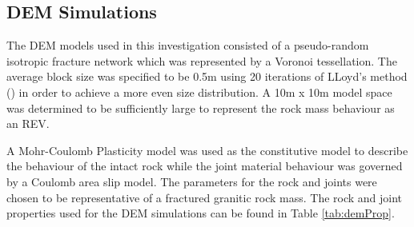 \subsection{DEM Simulations}

The DEM models used in this investigation consisted of a pseudo-random isotropic fracture network which was represented by a Voronoi tessellation. The average block size was specified to be 0.5m using 20 iterations of LLoyd's method (\cite{Lloyd_1982}) in order to achieve a more even size distribution. A 10m x 10m model space was determined to be sufficiently large to represent the rock mass behaviour as an REV. 

A Mohr-Coulomb Plasticity model was used as the constitutive model to describe the behaviour of the intact rock while the joint material behaviour was governed by a Coulomb area slip model. The parameters for the rock and joints were chosen to be representative of a fractured granitic rock mass. The rock and joint properties used for the DEM simulations can be found in Table \ref{tab:demProp}.





